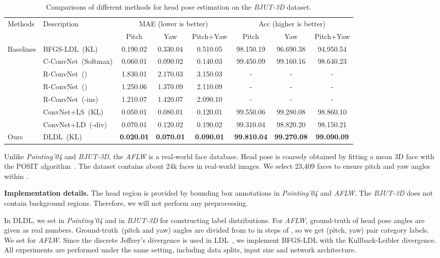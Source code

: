 \documentclass[journal]{IEEEtran}
\begin{document}
\begin{table*}
	\centering
	\caption{Comparisons of different methods for head pose estimation on the \emph{BJUT-3D} dataset.} \label{table:pose-bj}
	\footnotesize
	\begin{tabular}{|l|l|ccc|ccc|}
		\hline
		\multirow{2}{*}{Methods} &\multirow{2}{*}{Description}  &\multicolumn{3}{c|}{MAE (lower is better)} &\multicolumn{3}{c|}{Acc (higher is better)}\\
		& & Pitch & Yaw & Pitch+Yaw  &Pitch & Yaw & Pitch+Yaw\\
        \hline \hline
		\multirow{7}{*}{Baselines}
		&BFGS-LDL~(KL)     &0.190.02 &0.330.04 &0.510.05 &98.150.19 &96.690.38 &94.950.54\\
		&C-ConvNet~(Softmax) &0.060.01 &0.090.02 &0.140.03 &99.450.09 &99.160.16 &98.640.23  \\
		&R-ConvNet~() &1.830.01 &2.170.03 &3.150.03 &- &- &- \\
        &R-ConvNet~() &1.250.06 &1.370.09 &2.110.09 &- &- &- \\
        &R-ConvNet~(-ins) &1.210.07 &1.420.07 &2.090.10 &- &- &-\\
        &ConvNet+LS~(KL) &0.050.01 &0.080.01 &0.120.01 &99.550.06 &99.280.08 &98.860.10\\
        &ConvNet+LD~(-div) &0.070.01 &0.120.02 &0.190.02 &99.310.04 &98.820.20 &98.150.21\\
        \hline \hline
		\multirow{1}{*}{Ours}
		&DLDL~(KL) &\textbf{0.020.01} &\textbf{0.070.01} &\textbf{0.090.01} &\textbf{99.810.04} &\textbf{99.270.08}&\textbf{99.090.09}\\
        \hline
	\end{tabular}
\end{table*}

Unlike \emph{Pointing'04} and \emph{BJUT-3D}, the \emph{AFLW} is a real-world face database. Head pose is coarsely obtained by fitting a mean 3D face with the POSIT algorithm~\cite{dementhon1995model}. The dataset contains about 24k faces in real-world images. We select 23,409 faces to ensure pitch and yaw angles within .

\textbf{Implementation details.} The head region is provided by bounding box annotations in \emph{Pointing'04} and \emph{AFLW}. The \emph{BJUT-3D} does not contain background regions.  Therefore, we will not perform any preprocessing.

In DLDL, we set  in \emph{Pointing'04} and  in \emph{BJUT-3D} for constructing label distributions. For \emph{AFLW}, ground-truth of head pose angles are given as real numbers. Ground-truth~(pitch and yaw) angles are divided from  to  in steps of , so we get  (pitch, yaw) pair category labels. We set  for \emph{AFLW}. Since the discrete Jeffrey's divergence is used in LDL~\cite{geng2014head}, we implement BFGS-LDL with the Kullback-Leibler divergence. All experiments are performed under the same setting, including data splits, input size and network architecture.
\end{document}
